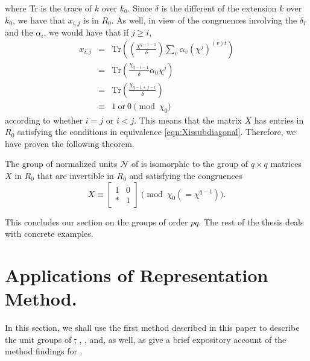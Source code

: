 \documentclass[11pt]{report}
\begin{document}
where Tr is the trace of $k$ over $k_0$. Since $\delta$ is the different of 
the extension $k$ over $k_0$, we have
that $x_{i,j}$ is in $R_0$. As well, in view of the congruences involving 
the $\delta_i$ and the $\alpha_i$, we would have
that if $j\ge i$,
\begin{align*}
x_{i,j}&=&\mathrm{Tr}\left(\left(\frac{\chi^{q-i-1}}{\delta}\right)
\sum_v\alpha_v(\chi^j)^{(v)t}\right)\\
 &=&\mathrm{Tr}\left(\frac{\chi_{q-i-1}}{\delta}\alpha_0\chi^j\right)\\
&=&\mathrm{Tr}\left(\frac{\chi_{q-1+j-i}}{\delta}\right)\\
&\equiv& 1 \mathrm{\ or \ } 0 \pmod{\chi_0}
\end{align*}
according to whether $i =j$ or $i < j$. This means that the matrix $X$ 
has entries in $R_0$ satisfying
the conditions in equivalence \ref{eqn:Xissubdiagonal}. 
Therefore, we have proven the following 
theorem.

\begin{theorem}
The group of normalized units $\mathscr{N}$ of \intG{}
 is isomorphic to the group 
of $q \times q$ matrices $X$ in $R_0$
that are invertible in $R_0$ and satisfying the congruences
\begin{equation*}
 X\equiv 
\begin{bmatrix}
1&0\\
*&1
\end{bmatrix}
\pmod{\chi_0(=\chi^{q-1})}.
\end{equation*}
\end{theorem}

        This concludes our section on the groups of order $pq$. The rest of 
the thesis deals with
concrete examples.
\chapter{Applications of Representation Method.}


In this section, we shall use the first method described in this 
paper to describe the unit
groups of \st, \df, \ds, and, as well, as give a brief expository 
account of the method findings
for \af.
\end{document}
